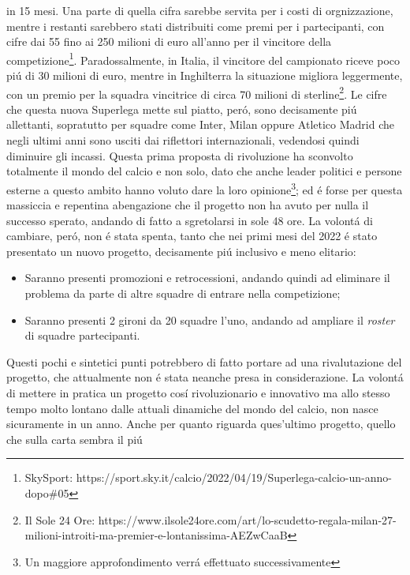 \documentclass[
    corpo=12pt,
    oneside,
    evenboxes,
    tipotesi=triennale,
    stile=classica,
    oldstyle,
    autoretitolo,
    greek,
]{toptesi}
\begin{document}
\begin{interlinea}{1.5}
in 15 mesi. Una parte di quella cifra sarebbe servita per i costi di orgnizzazione, mentre i restanti sarebbero stati distribuiti come premi per i partecipanti,
con cifre dai 55 fino ai 250 milioni di euro all'anno per il vincitore della competizione\footnote{SkySport: https://sport.sky.it/calcio/2022/04/19/Superlega-calcio-un-anno-dopo\#05}.\linebreak 
Paradossalmente, in Italia, il vincitore del campionato riceve poco pi\'u di 30 milioni di euro, mentre in Inghilterra la situazione migliora 
leggermente, con un premio per la squadra vincitrice di circa 70 milioni di sterline\footnote{Il Sole 24 Ore: https://www.ilsole24ore.com/art/lo-scudetto-regala-milan-27-milioni-introiti-ma-premier-e-lontanissima-AEZwCaaB}. 
Le cifre che questa nuova Superlega mette sul piatto, per\'o, sono decisamente pi\'u allettanti, sopratutto per squadre come Inter, 
Milan oppure Atletico Madrid che negli ultimi anni sono usciti dai riflettori internazionali, vedendosi quindi diminuire gli incassi.\newline
Questa prima proposta di rivoluzione ha sconvolto totalmente il mondo del calcio e non solo, dato che anche leader politici e persone esterne
a questo ambito hanno voluto dare la loro opinione\footnote{Un maggiore approfondimento verr\'a effettuato successivamente}; ed \'e forse per 
questa massiccia e repentina abengazione che il progetto non ha avuto per nulla il successo sperato, andando di fatto a sgretolarsi in sole 48 ore. La volont\'a di 
cambiare, per\'o, non \'e stata spenta, tanto che nei primi mesi del 2022 \'e stato presentato un nuovo progetto, decisamente pi\'u inclusivo e 
meno elitario:
\begin{itemize}
    \item Saranno presenti promozioni e retrocessioni, andando quindi ad eliminare il problema da parte di altre squadre di entrare nella competizione;
    \item Saranno presenti 2 gironi da 20 squadre l'uno, andando ad ampliare il \emph{roster} di squadre partecipanti.
\end{itemize} 
Questi pochi e sintetici punti potrebbero di fatto portare ad una rivalutazione del progetto, che attualmente non \'e stata neanche presa in
considerazione.\newline
La volont\'a di mettere in pratica un progetto cos\'i rivoluzionario e innovativo ma allo stesso tempo molto lontano dalle attuali dinamiche del
mondo del calcio, non nasce sicuramente in un anno. Anche per quanto riguarda ques'ultimo progetto, quello che sulla carta sembra il pi\'u

\end{interlinea}
\end{document}
